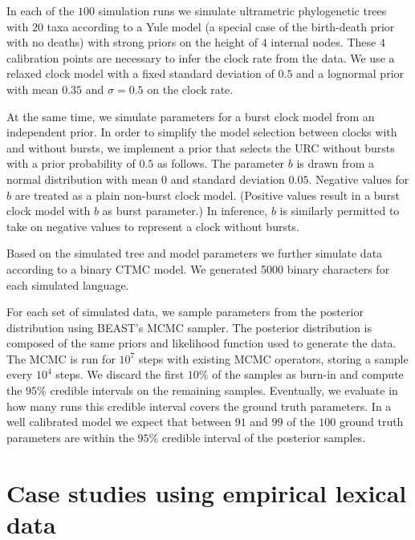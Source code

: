 \documentclass[]{rsos}%
\begin{document}
In each of the $100$ simulation runs we simulate ultrametric phylogenetic trees with $20$ taxa according to a Yule model (a special case of the birth-death prior with no deaths) with strong priors on the height of $4$ internal nodes. These $4$ calibration points are necessary to infer the clock rate from the data. We use a relaxed clock model with a fixed standard deviation of $0.5$ and a lognormal prior with mean $0.35$ and $\sigma = 0.5$ on the clock rate.

At the same time, we simulate parameters for a burst clock model from an independent prior. In order to simplify the model selection between clocks with and without bursts, we implement a prior that selects the URC without bursts with a prior probability of $0.5$ as follows. The parameter $b$ is drawn from a normal distribution with mean $0$ and standard deviation $0.05$. Negative values for $b$ are treated as a plain non-burst clock model. (Positive values result in a burst clock model with $b$ as burst parameter.) In inference, $b$ is similarly permitted to take on negative values to represent a clock without bursts.

Based on the simulated tree and model parameters we further simulate data according to a binary CTMC model. We generated 5000 binary characters for each simulated language.

For each set of simulated data, we sample parameters from the posterior distribution using BEAST's MCMC sampler. The posterior distribution is composed of the same priors and likelihood function used to generate the data.
The MCMC is run for $10^7$ steps with existing MCMC operators, storing a sample every $10^4$ steps. We discard the first $10\%$ of the samples as burn-in and compute the $95\%$ credible intervals on the remaining samples. Eventually, we evaluate in how many runs this credible interval covers the ground truth parameters. In a well calibrated model we expect that between $91$ and $99$ of the $100$ ground truth parameters are within the $95\%$ credible interval of the posterior samples.

\section{Case studies using empirical lexical data}
\label{s:lexical}
\end{document}
